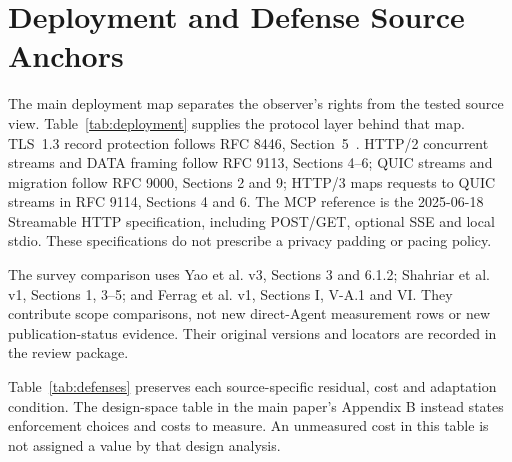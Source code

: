 \section{Deployment and Defense Source Anchors}\label{supp:deployment}
The main deployment map separates the observer's rights from the tested source view. Table~\ref{tab:deployment} supplies the protocol layer behind that map. TLS~1.3 record protection follows RFC 8446, Section~5~\cite{rfc8446}. HTTP/2 concurrent streams and DATA framing follow RFC 9113, Sections 4--6; QUIC streams and migration follow RFC 9000, Sections 2 and 9; HTTP/3 maps requests to QUIC streams in RFC 9114, Sections 4 and 6. The MCP reference is the 2025-06-18 Streamable HTTP specification, including POST/GET, optional SSE and local stdio. These specifications do not prescribe a privacy padding or pacing policy.



The survey comparison uses Yao et al. v3, Sections 3 and 6.1.2; Shahriar et al. v1, Sections 1, 3--5; and Ferrag et al. v1, Sections I, V-A.1 and VI. They contribute scope comparisons, not new direct-Agent measurement rows or new publication-status evidence. Their original versions and locators are recorded in the review package.





Table~\ref{tab:defenses} preserves each source-specific residual, cost and adaptation condition. The design-space table in the main paper's Appendix B instead states enforcement choices and costs to measure. An unmeasured cost in this table is not assigned a value by that design analysis.
